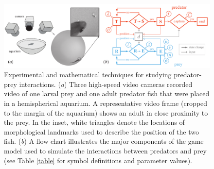 \documentclass[]{rsos}%
\begin{document}
\pagebreak

\linespread{1}\selectfont %


\begin{figure}[!h]
\centering
	\includegraphics[width=5.5in]{fig_setup}
\caption{Experimental and mathematical techniques for studying predator-prey interactions. 
(\textit{a}) Three high-speed video cameras recorded video of one larval prey and one adult predator fish that were placed in a hemispherical aquarium. 
A representative video frame (cropped to the margin of the aquarium) shows an adult in close proximity to the prey. 
In the inset, white triangles denote the locations of morphological landmarks used to describe the position of the two fish.
 (\textit{b}) A flow chart illustrates the major components of the game model used to simulate the interactions between predators and prey (see Table \ref{table} for symbol definitions and parameter values).}
\label{fig_setup}
\end{figure}

\pagebreak
\end{document}
